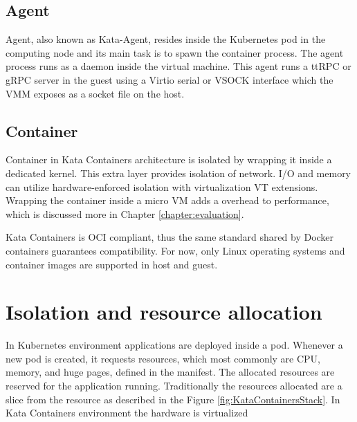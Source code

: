 \subsection{Agent}

Agent, also known as Kata-Agent, resides inside the Kubernetes pod in the computing node and its main task is to spawn the container process. The agent process runs as a daemon inside the virtual machine. This agent runs a ttRPC or gRPC server in the guest using a Virtio serial or VSOCK interface which the VMM exposes as a socket file on the host. \cite{KataContainersArchitecture}

\subsection{Container}

Container in Kata Containers architecture is isolated by wrapping it inside a dedicated kernel. This extra layer provides isolation of network. I/O and memory can utilize hardware-enforced isolation with virtualization VT extensions. Wrapping the container inside a micro VM adds a overhead to performance, which is discussed more in Chapter \ref{chapter:evaluation}. \cite{KataContainers}

Kata Containers is OCI compliant, thus the same standard shared by Docker containers guarantees compatibility. For now, only Linux operating systems and container images are supported in host and guest.

\section{Isolation and resource allocation}

In Kubernetes environment applications are deployed inside a pod. Whenever a new pod is created, it requests resources, which most commonly are CPU, memory, and huge pages, defined in the manifest. The allocated resources are reserved for the application running. Traditionally the resources allocated are a slice from the resource as described in the Figure \ref{fig:KataContainersStack}. In Kata Containers environment the hardware is virtualized


